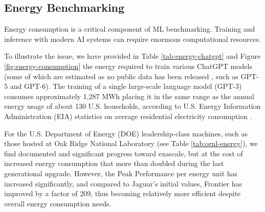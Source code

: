 \subsection{Energy Benchmarking}
\label{sec:energy}

Energy consumption is a critical component of  ML benchmarking. Training and inference with modern AI systems can require enormous computational resources. 


To illustrate the issue, we have provided in Table \ref{tab:energy-chatgpt} and Figure \ref{fig:energy-consumption} the energy required to train various ChatGPT models (some of which are estimated as no public data has been released \cite{sciencefeedback2024energy,kaplan2020scaling}, such as GPT-5 and GPT-6). The training of a single large-scale language model (GPT-3) consumes approximately 1,287 MWh placing it in the same range as the annual energy usage of about 130 U.S. households, according to U.S. Energy Information Administration (EIA) statistics on average residential electricity consumption \cite{EIA_Electricity_Price_2025,eia2024residential,WECEnergy,patterson2021carbon,jegham2025hungryaibenchmarkingenergy,baeldung2023energy}. 

For the U.S. Department of Energy (DOE) leadership-class machines, such as those hosted at Oak Ridge National Laboratory (see Table \ref{tab:ornl-energy}), we find documented and significant progress toward exascale, but at the cost of increased energy consumption that more than doubled during the last generational upgrade. However, the Peak Performance per energy unit has increased significantly, and compared to Jaguar's initial values, Frontier has improved by a factor of 209, thus becoming relatively more efficient despite overall energy consumption needs.


\begin{table}[tb]
\centering
\caption{Estimated Energy Consumption of GPT Models for Training and Inference 
(Based on \cite{brown2020language, patterson2021carbon, medium2023gpt4carbon, 
extremenetworks2023energy, epochai2024compute, hackernoon2024dirtysecret}).}
\label{tab:energy-chatgpt}
\end{table}

